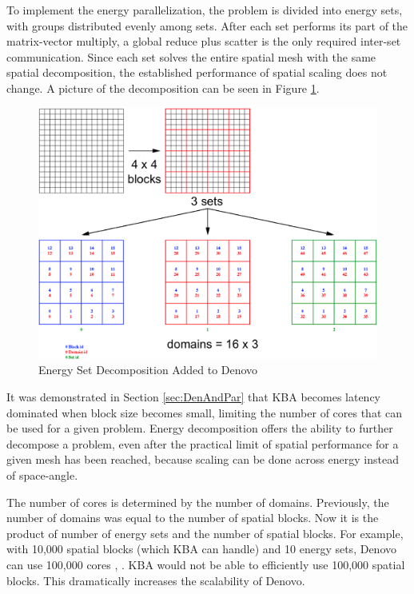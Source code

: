To implement the energy parallelization, the problem is divided into energy sets, with groups distributed evenly among sets. After each set performs its part of the matrix-vector multiply, a global reduce plus scatter is the only required inter-set communication. Since each set solves the entire spatial mesh with the same spatial decomposition, the established performance of spatial scaling does not change. A picture of the decomposition can be seen in Figure \ref{fig:EnergyDecomp}.
%
\begin{figure}[!h]
  \begin{center}
    \includegraphics [width=.8\textwidth, height=0.45\textheight ] {EnergySets}
  \end{center}
  \caption{Energy Set Decomposition Added to Denovo \cite{Evans2011}}
  \label{fig:EnergyDecomp}
\end{figure}

It was demonstrated in Section \ref{sec:DenAndPar} that KBA becomes latency dominated when block size becomes small, limiting the number of cores that can be used for a given problem. Energy decomposition offers the ability to further decompose a problem, even after the practical limit of spatial performance for a given mesh has been reached, because scaling can be done across energy instead of space-angle. 

The number of cores is determined by the number of domains. Previously, the number of domains was equal to the number of spatial blocks. Now it is the product of number of energy sets and the number of spatial blocks. For example, with 10,000 spatial blocks (which KBA can handle) and 10 energy sets, Denovo can use 100,000 cores \cite{Evans2011}, \cite{Evans2010}. KBA would not be able to efficiently use 100,000 spatial blocks. This dramatically increases the scalability of Denovo.

